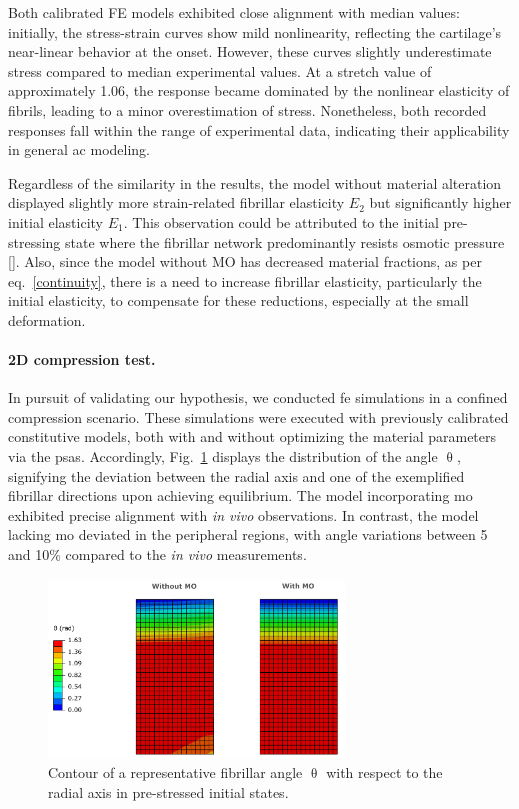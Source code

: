 Both calibrated FE models exhibited close alignment with median values: initially, the stress-strain curves show mild nonlinearity, reflecting the cartilage's near-linear behavior at the onset. However, these curves slightly underestimate stress compared to median experimental values. At a stretch value of approximately 1.06, the response became dominated by the nonlinear elasticity of fibrils, leading to a minor overestimation of stress. Nonetheless, both recorded responses fall within the range of experimental data, indicating their applicability in general \ac{ac} modeling.

Regardless of the similarity in the results, the model without material alteration displayed slightly more strain-related fibrillar elasticity $E_2$ but significantly higher initial elasticity $E_1$. This observation could be attributed to the initial pre-stressing state where the fibrillar network predominantly resists osmotic pressure [\cite{quiroga2017}]. Also, since the model without MO has decreased material fractions, as per eq.~\ref{continuity}, there is a need to increase fibrillar elasticity, particularly the initial elasticity, to compensate for these reductions, especially at the small deformation.

\paragraph{2D compression test.} In pursuit of validating our hypothesis, we conducted \ac{fe} simulations in a confined compression scenario. These simulations were executed with previously calibrated constitutive models, both with and without optimizing the material parameters via the \acp{psa}. Accordingly, Fig.~\ref{fig:fiber_orientation} displays the distribution of the angle $\uptheta$, signifying the deviation between the radial axis and one of the exemplified fibrillar directions upon achieving equilibrium. The model incorporating \ac{mo} exhibited precise alignment with \textit{in vivo} observations. In contrast, the model lacking \ac{mo} deviated in the peripheral regions, with angle variations between 5 and 10\% compared to the \textit{in vivo} measurements.
%
\begin{figure}\centering
\includegraphics[width=0.7\textwidth]{img/fiber_orientation.jpg}
\caption{Contour of a representative fibrillar angle $\uptheta$  with respect to the radial axis in pre-stressed initial states.}
\label{fig:fiber_orientation}
\end{figure}

